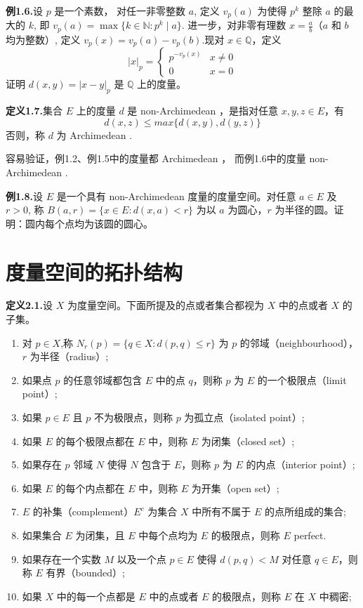 \documentclass{article}
\begin{document}
\textbf{例1.6.}设 $p$ 是一个素数，
对任一非零整数 $a$,
定义 $v_p(a)$ 为使得 $p^k$ 整除 $a$ 的最大的 $k$,
即 $v_p(a) = \max\{k\in\mathbb{N}: p^k\mid a\}$.
进一步，对非零有理数 $x = \frac{a}{b}$（$a$ 和 $b$ 均为整数）,
定义 $v_p(x) = v_p(a) - v_p(b)$.现对 $x\in\mathbb{Q}$，定义
$$\vert x\vert_p = \begin{cases} p^{-v_p(x)} & x\neq 0 \\ 0 & x=0 \end{cases}$$
证明 $d(x,y) = \vert x-y\vert_p$ 是 $\mathbb{Q}$ 上的度量。

\textbf{定义1.7.}集合 $E$ 上的度量 $d$ 是 non-Archimedean ，是指对任意 $x,y,z\in E$，有
$$d(x,z) \leq max\{d(x,y),d(y,z)\}$$
否则，称 $d$ 为 Archimedean .

容易验证，例1.2、例1.5中的度量都 Archimedean ，
而例1.6中的度量 non-Archimedean .

\textbf{例1.8.}设 $E$ 是一个具有 non-Archimedean 度量的度量空间。对任意 $a\in E$ 及 $r>0$,
称 $B(a,r) = \{x\in E: d(x,a)<r\}$ 为以 $a$ 为圆心，$r$ 为半径的圆。证明：圆内每个点均为该圆的圆心。

\section{度量空间的拓扑结构}
\textbf{定义2.1.}设 $X$ 为度量空间。下面所提及的点或者集合都视为 $X$ 中的点或者 $X$ 的子集。
\begin{enumerate}[label={\textbullet}]
    \item 对 $p\in X$,称 $N_r(p) = \{q\in X: d(p,q)\leq r\}$ 为 $p$ 的邻域（neighbourhood），$r$ 为半径（radius）;
    \item 如果点 $p$ 的任意邻域都包含 $E$ 中的点 $q$，则称 $p$ 为 $E$ 的一个极限点（limit point）;
    \item 如果 $p\in E$ 且 $p$ 不为极限点，则称 $p$ 为孤立点（isolated point）;
    \item 如果 $E$ 的每个极限点都在 $E$ 中，则称 $E$ 为闭集（closed set）;
    \item 如果存在 $p$ 邻域 $N$ 使得 $N$ 包含于 $E$，则称 $p$ 为 $E$ 的内点（interior point）;
    \item 如果 $E$ 的每个内点都在 $E$ 中，则称 $E$ 为开集（open set）;
    \item $E$ 的补集（complement）$E^c$ 为集合 $X$ 中所有不属于 $E$ 的点所组成的集合;
    \item 如果集合 $E$ 为闭集，且 $E$ 中每个点均为 $E$ 的极限点，则称 $E$ perfect.
    \item 如果存在一个实数 $M$ 以及一个点 $p\in E$ 使得 $d(p,q)<M$ 对任意 $q\in E$，则称 $E$ 有界（bounded）;
    \item 如果 $X$ 中的每一个点都是 $E$ 中的点或者 $E$ 的极限点，则称 $E$ 在 $X$ 中稠密;
\end{enumerate}
\end{document}
